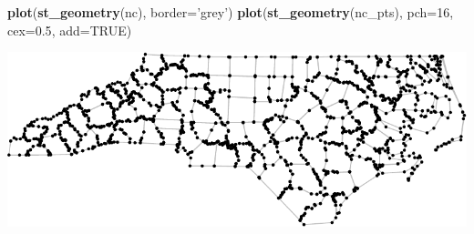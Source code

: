 \documentclass[11pt,ignorenonframetext,]{beamer}
\newenvironment{Shaded}{}{}
\newcommand{\DataTypeTok}[1]{\textcolor[rgb]{0.56,0.13,0.00}{#1}}
\newcommand{\DecValTok}[1]{\textcolor[rgb]{0.25,0.63,0.44}{#1}}
\newcommand{\FloatTok}[1]{\textcolor[rgb]{0.25,0.63,0.44}{#1}}
\newcommand{\KeywordTok}[1]{\textcolor[rgb]{0.00,0.44,0.13}{\textbf{#1}}}
\newcommand{\NormalTok}[1]{#1}
\newcommand{\OtherTok}[1]{\textcolor[rgb]{0.00,0.44,0.13}{#1}}
\newcommand{\StringTok}[1]{\textcolor[rgb]{0.25,0.44,0.63}{#1}}
\let\oldShaded\Shaded
\let\endoldShaded\endShaded
\renewenvironment{Shaded}{\footnotesize\begin{spacing}{0.9}\oldShaded}{\endoldShaded\end{spacing}}
\let\oldverbatim\verbatim
\let\endoldverbatim\endverbatim
\newcommand{\scriptoutput}{
  \renewenvironment{Shaded}{\scriptsize\begin{spacing}{0.9}\oldShaded}{\endoldShaded\end{spacing}}
  \renewenvironment{verbatim}{\scriptsize\begin{spacing}{0.9}\oldverbatim}{\endoldverbatim\end{spacing}}
}
\begin{document}
\begin{frame}[fragile,t]{}
\protect\hypertarget{section}{}

\scriptoutput

\begin{Shaded}
\begin{Highlighting}[]
\KeywordTok{plot}\NormalTok{(}\KeywordTok{st_geometry}\NormalTok{(nc), }\DataTypeTok{border=}\StringTok{'grey'}\NormalTok{)}
\KeywordTok{plot}\NormalTok{(}\KeywordTok{st_geometry}\NormalTok{(nc_pts), }\DataTypeTok{pch=}\DecValTok{16}\NormalTok{, }\DataTypeTok{cex=}\FloatTok{0.5}\NormalTok{, }\DataTypeTok{add=}\OtherTok{TRUE}\NormalTok{)}
\end{Highlighting}
\end{Shaded}

\begin{center}\includegraphics[width=\textwidth]{Lec16_files/figure-beamer/unnamed-chunk-18-1} \end{center}

\end{frame}
\end{document}
